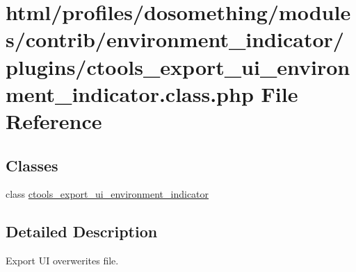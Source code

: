\hypertarget{ctools__export__ui__environment__indicator_8class_8php}{
\section{html/profiles/dosomething/modules/contrib/environment\_\-indicator/plugins/ctools\_\-export\_\-ui\_\-environment\_\-indicator.class.php File Reference}
\label{ctools__export__ui__environment__indicator_8class_8php}
}
\subsection*{Classes}
\begin{DoxyCompactItemize}
\item 
class \hyperlink{classctools__export__ui__environment__indicator}{ctools\_\-export\_\-ui\_\-environment\_\-indicator}
\end{DoxyCompactItemize}


\subsection{Detailed Description}
Export UI overwerites file. 